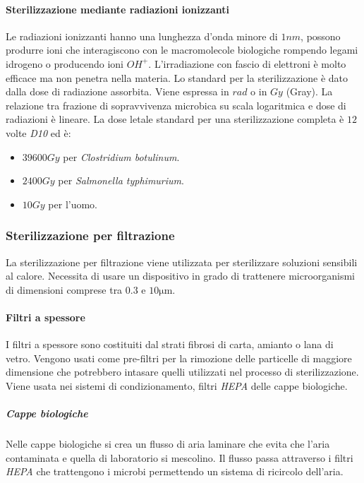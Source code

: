 			\paragraph{Sterilizzazione mediante radiazioni ionizzanti}
			Le radiazioni ionizzanti hanno una lunghezza d'onda minore di $1 nm$, possono produrre ioni che interagiscono con le macromolecole biologiche rompendo legami idrogeno o producendo ioni \emph{$OH^+$}.
			L'irradiazione con fascio di elettroni \`e molto efficace ma non penetra nella materia.
			Lo standard per la sterilizzazione \`e dato dalla dose di radiazione assorbita.
			Viene espressa in $\si{rad}$ o in $\si{Gy}$ (Gray).
			La relazione tra frazione di sopravvivenza microbica su scala logaritmica e dose di radiazioni \`e lineare.
			La dose letale standard per una sterilizzazione completa \`e $12$ volte \emph{D10} ed \`e:
			\begin{multicols}{2}
    				\begin{itemize}
        				\item $39600 Gy$ per \textit{Clostridium botulinum}. 
        				\item $2400 Gy$ per \textit{Salmonella typhimurium}.
        				\item $10 Gy$ per l'uomo.
    				\end{itemize}
			\end{multicols}

		\subsubsection{Sterilizzazione per filtrazione}
		La sterilizzazione per filtrazione viene utilizzata per sterilizzare soluzioni sensibili al calore.
		Necessita di usare un dispositivo in grado di trattenere microorganismi di dimensioni comprese tra $0.3$ e $10\si{\micro\metre}$.

			\paragraph{Filtri a spessore}
			I filtri a spessore sono costituiti dal strati fibrosi di carta, amianto o lana di vetro.
			Vengono usati come pre-filtri per la rimozione delle particelle di maggiore dimensione che potrebbero intasare quelli utilizzati nel processo di sterilizzazione.
			Viene usata nei sistemi di condizionamento, filtri \emph{HEPA} delle cappe biologiche.
			
				\subparagraph{Cappe biologiche}
				Nelle cappe biologiche si crea un flusso di aria laminare che evita che l'aria contaminata e quella di laboratorio si mescolino.
				Il flusso passa attraverso i filtri \emph{HEPA} che trattengono i microbi permettendo un sistema di ricircolo dell'aria.

